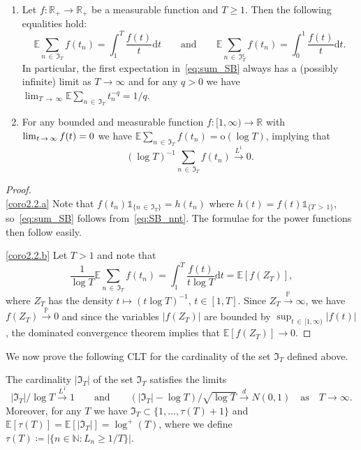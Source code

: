 \documentclass[10pt]{amsart}
\theoremstyle{definition}\newtheorem{defi}[theo]{Definition}\newtheorem{rema}[theo]{Remark}\newtheorem{exam}[theo]{Example}\newtheorem{exem}[theo]{Example}\newtheorem{nota}[theo]{Notation}
\newcommand\N{\mathbb{N}}
\newcommand\R{\mathbb{R}}
\newcommand\E{\mathds{E}}
\newcommand\p{\mathds{P}}
\newcommand\1{\mathds{1}}
\newcommand\D{\mathrm{d}}
\newcommand\oh{\mathrm{o}}
\newcommand\GI{\mathfrak{I}}
\newcommand\co{\mathsf{c}}
\newcommand\cid{\xrightarrow{d}}
\newcommand\cip{\xrightarrow{\p}}
\newcommand\ciL{\xrightarrow{L^1}}
\newcommand*{\alphenumi}{\renewcommand*{\theenumi}{\alph{enumi}}}
\begin{document}
\begin{coro}\label{cor:int_SB_tauT}
\begin{enumerate}\alphenumi
\item\label{coro2.2.a} Let $f:\R_+\to\R_+$ be a measurable function and $T\geq1$. Then the following equalities hold:
\begin{equation}\label{eq:sum_SB}
\E\sum_{n\,\in\,\GI_T}f(t_n) =\int_1^T \frac{f(t)}{t}\D t
\qquad\text{and}\qquad
\E\sum_{n\,\in\,\GI_T^\co}f(t_n) =\int_0^1 \frac{f(t)}{t}\D t.
\end{equation}
In particular, the first expectation in~\eqref{eq:sum_SB} always has a (possibly infinite) limit as $T\to\infty$ and for any $q>0$ we have $\lim_{T\,\to\,\infty}\E\sum_{n\,\in\,\GI_T}t_n^{-q}=1/q$.

\item\label{coro2.2.b} For any bounded and measurable function $f:[1,\infty)\to\R$ with $\lim_{t\,\to\,\infty}f(t)\linebreak=0$ we have $\E\sum_{n\,\in\,\GI_T}f(t_n)=\oh(\log T)$, implying that 
\[
(\log T)^{-1}\sum_{n\,\in\,\GI_T}f(t_n)\ciL 0.
\]
\end{enumerate}
\end{coro}

\begin{proof}\* \\[0.5em]
\eqref{coro2.2.a} Note that $f(t_n)\1_{\{n\,\in\,\GI_T\}}=h(t_n)$ where $h(t)=f(t)\1_{\{T\,>\,1\}}$, so~\eqref{eq:sum_SB} follows from~\eqref{eq:SB_nnt}. The formulae for the power functions then follow easily.

\noindent\eqref{coro2.2.b} Let $T>1$ and note that
\[
\frac{1}{\log T}\E\sum_{n\,\in\,\GI_T}f(t_n) =\int_1^T \frac{f(t)}{t\log T}\D t =\E\left[f\left(Z_T\right)\right],
\]
where $Z_T$ has the density $t\mapsto (t\log T)^{-1}$, $t\in[1,T]$. Since $Z_T\cip\infty$, we have $f(Z_T)\cip 0$ and since the variables $|f(Z_T)|$ are bounded by $\sup_{t\,\in\,[1,\infty)}|f(t)|$, the dominated convergence theorem implies that $\E[f(Z_T)]\to 0$.
\end{proof}

We now prove the following CLT for the cardinality of the set $\GI_T$ defined above.

\begin{prop}\label{prop:sizeof_n_T}
The cardinality $|\GI_T|$ of the set $\GI_T$ satisfies the limits
\[
|\GI_T|/\log T\ciL 1
\qquad\text{and}\qquad \left(\left|\GI_T\right|-\log T\right)/\sqrt{\log T}\cid N(0,1)
\quad
\text{as}\quad T\to\infty.
\]
Moreover, for any $T$ we have $\GI_T\subset\{1,\ldots,\tau(T)+1\}$ and $\E[\tau(T)]=\E[|\GI_T|]=\log^+(T)$, where we define $\tau(T)\coloneqq|\{n\in\N: L_n\ge1/T\}|$.
\end{prop}
\end{document}
